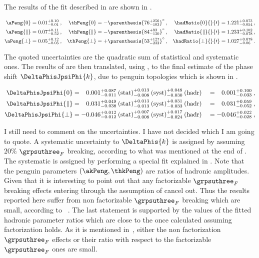 The results of the \chisq fit described in  are shown in .

\begin{subequations}
\label{peng_a_theta_results}
\begin{align}
    \aPeng{0}         & = 0.01^{+0.10}_{-0.01}\:, & \thPeng{0}         & = -\parenthesis{76^{+256}_{-103}}^\circ\:, & \hadRatio{0}{}{\prime}         = 1.221^{+0.073}_{-0.054}\:,\\
    \aPeng{\parallel} & = 0.07^{+0.11}_{-0.52}\:, & \thPeng{\parallel} & = -\parenthesis{84^{+93}_{-130}}^\circ\:,  & \hadRatio{\parallel}{}{\prime} = 1.233^{+0.102}_{-0.078}\:,\\
    \aPeng{\perp}     & = 0.05^{+0.12}_{-0.05}\:, & \thPeng{\perp}     & = +\parenthesis{53^{+127}_{-232}}^\circ\:, & \hadRatio{\perp}{}{\prime}     = 1.027^{+0.078}_{-0.06}\:.
\end{align}
\end{subequations}

\noindent The quoted uncertainties are the quadratic sum of statistical and systematic ones.
The results of  are then translated, using ,
to the final estimate of the phase shift $\DeltaPhisJpsiPhi{k}$, due to penguin topologies which is shown in .

\begin{alignat}{2}
\DeltaPhisJpsiPhi{0} & =
\phantom{-}0.001^{+0.087}_{-0.011}\:\text{(stat)}^{+0.013}_{-0.008}\:\text{(syst)}^{+0.048}_{-0.030}\:(\text{hadr})
&& = \phantom{-}0.001^{+0.100}_{-0.033}\:,\\
%
\DeltaPhisJpsiPhi{\parallel} & =
\phantom{-}0.031^{+0.049}_{-0.038}\:\text{(stat)}^{+0.013}_{-0.013}\:\text{(syst)}^{+0.031}_{-0.033}\:(\text{hadr})
&& = \phantom{-}0.031^{+0.059}_{-0.052}\:,\\
%
\DeltaPhisJpsiPhi{\perp} & =
-0.046^{+0.012}_{-0.012}\:\text{(stat)}^{+0.007}_{-0.008}\:\text{(syst)}^{+0.017}_{-0.024}\:(\text{hadr})
&& = -0.046^{+0.022}_{-0.028}\:,
\label{delta_phis_result}
\end{alignat}

{\color{red} I still need to comment on the uncertainties. I have not decided which I am going to quote.}
A systematic uncertainty to $\DeltaPhis{k}$ is assigned by assuming $20\%$ $\grpsuthree_F$ breaking,
according to what was mentioned at the end of . The systematic is assigned
by performing a special fit explained in . Note that the penguin parameters
$(\akPeng,\thkPeng)$ are ratios of hadronic amplitudes. Given that it is
interesting to point out that any factorizable $\grpsuthree_F$ breaking effects entering through the assumption
of  cancel out.
Thus the results reported here suffer from non factorizable $\grpsuthree_F$ breaking which are small,
according to ~\cite{DeBruyn-thesis}. The last statement is supported by the values of the fitted hadronic parameter
ratios which are close to the once calculated assuming factorization holds. As it is mentioned in~\cite{DeBruyn-thesis},
either the non factorization $\grpsuthree_F$ effects or their ratio with respect to the factorizable $\grpsuthree_F$
ones are small.

